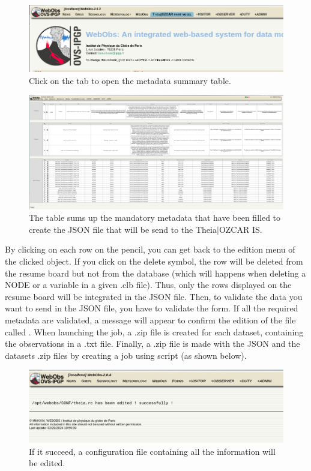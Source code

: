 \begin{figure}[!h]
	\centering
	\includegraphics[width=\textwidth]{figures/theia_tab.png}
	\caption{Click on the tab to open the metadata summary table.}
	\label{showTHEIA}
\end{figure}

\begin{figure}[!h]
	\centering
	\includegraphics[width=\textwidth]{figures/theia_recap_table.png}
	\caption{The table sums up the mandatory metadata that have been filled to create the JSON file that will be send to the Theia$\vert$OZCAR IS.}
	\label{showTHEIA2}
\end{figure}

By clicking on each row on the pencil, you can get back to the edition menu of the clicked object. If you click on the delete symbol, the row will be deleted from the resume board but not from the database (which will happens when deleting a NODE or a variable in a given .clb file). Thus, only the rows displayed on the resume board will be integrated in the JSON file. Then, to validate the data you want to send in the JSON file, you have to validate the form. If all the required metadata are  validated, a message will appear to confirm the edition of the file called . When launching the job, a .zip file is created for each dataset, containing the observations in a .txt file. Finally, a .zip file is made with the JSON and the datasets .zip files by creating a job using  script (as shown below).

\newpage

\begin{figure}[!h]
	\centering
	\includegraphics[scale=0.25]{figures/theia_rc.png}
	\caption{If it succeed, a configuration file containing all the information will be edited.}
	\label{theia.rc}
\end{figure}

